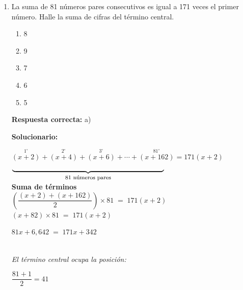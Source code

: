 \begin{enumerate}[resume]
$\boxed{2x+1}=3=\dfrac{2\times 3}{2}\ \Rightarrow\ 2x+1=2$\\

$\Rightarrow\ 2x=1$\\

$\Rightarrow\ x=\dfrac{1}{2}$\\

$\therefore\ \text{El valor de $x$ es }$\\




\item La suma de 81 números pares consecutivos es igual a 171 veces el primer número. Halle la suma de cifras del término central.

\begin{enumerate}[label=\alph*)]
	\item 8
	\item 9
	\item 7
	\item 6
	\item 5
\end{enumerate}

\textbf{Respuesta correcta:} a)

\vspace{2mm}
\textbf{Solucionario:}


$\overset{1^\circ}{(x+2)}+\overset{2^\circ}{(x+4)}+\overset{3^\circ}{(x+6)}+\cdots+\overset{81^\circ}{(x+162)}=171(x+2)$\\[-7mm]

\hspace{2mm}
$\underbrace{\hspace*{75mm}}_{\text{\footnotesize 81 números pares}}$\\[-2mm]

\vspace{2mm}
\hspace*{30mm}\textbf{Suma de términos}\\[1mm]

\hspace*{1mm}$\left(\dfrac{(x+2)+(x+162)}{2}\right)\times 81 \;=\;171(x+2)$\\


$(x+82)\times 81 \;=\;171(x+2)$

$81x+6,642 \;=\;171x+342$

\\

\textit{El término central ocupa la posición:}

$\dfrac{81+1}{2}=41$


\end{enumerate}
